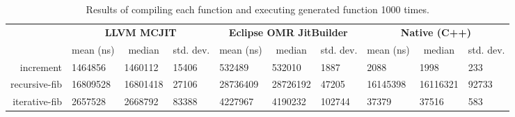 \begin{table*}[t]
  \begin{tabular}{|r|l|l|l|l|l|l|l|l|l|}
  \hline
  \multicolumn{1}{|l|}{\multirow{2}{*}{}} & \multicolumn{3}{c|}{\textbf{LLVM MCJIT}}                                                                                     & \multicolumn{3}{c|}{\textbf{Eclipse OMR JitBuilder}}                                                                & \multicolumn{3}{c|}{\textbf{Native (C++)}}                                                                               \\ \cline{2-10}
  \multicolumn{1}{|c|}{\textbf{Program}}  & \multicolumn{1}{c|}{mean (ns)}           & \multicolumn{1}{c|}{median}  & \multicolumn{1}{c|}{std. dev.}                     & \multicolumn{1}{c|}{mean (ns)}           & \multicolumn{1}{c|}{median}  & \multicolumn{1}{c|}{std. dev.}            & \multicolumn{1}{c|}{mean (ns)}  & \multicolumn{1}{c|}{median}  & \multicolumn{1}{c|}{std. dev.}                        \\ \hline
  increment                               & \num{1464856}                            & \num{1460112}                & \num{15406}                                        & \num{532489}                             & \num{532010}                 & \num{1887}                                & \num{2088}                              & \num{1998}                   & \num{233}                                \\ \hline
  recursive-fib                           & \num{16809528}                           & \num{16801418}               & \num{27106}                                        & \num{28736409}                           & \num{28726192}               & \num{47205}                               & \num{16145398}                          & \num{16116321}               & \num{92733}                                \\ \hline
  iterative-fib                           & \num{2657528}                            & \num{2668792}                & \num{83388}                                        & \num{4227967}                            & \num{4190232}                & \num{102744}                              & \num{37379}                             & \num{37516}                  & \num{583}                                \\ \hline
  \end{tabular}
  \caption{Results of compiling each function and executing generated function 1000 times.}
  \label{tab:1k_time}
\end{table*}